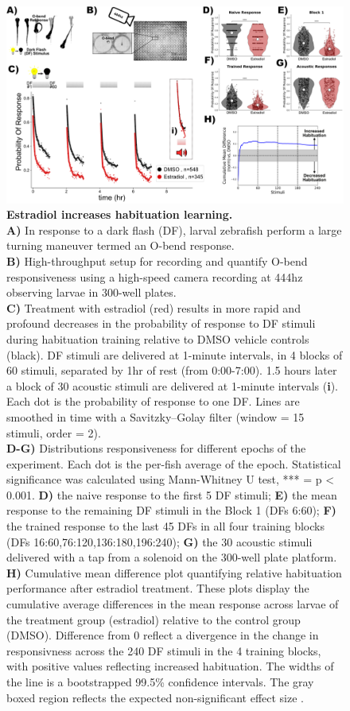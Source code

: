 \documentclass[9pt,lineno]{RandlettLab_elife}
\begin{document}
\begin{figure}
\begin{fullwidth}
\begin{center}
\includegraphics[width=0.75\linewidth]{figures/EstradiolEffect.png}
\caption{\textbf{Estradiol increases habituation learning.}
\\ \textbf{A)} In response to a dark flash (DF), larval zebrafish perform a large turning maneuver termed an O-bend response.
\\ \textbf{B)} High-throughput setup for recording and quantify O-bend responsiveness using a high-speed camera recording at 444hz observing larvae in 300-well plates.
\\ \textbf{C)} Treatment with estradiol (red) results in more rapid and profound decreases in the probability of response to DF stimuli during habituation training relative to DMSO vehicle controls (black). DF stimuli are delivered at 1-minute intervals, in 4 blocks of 60 stimuli, separated by 1hr of rest (from 0:00-7:00). 1.5 hours later a block of 30 acoustic stimuli are delivered at 1-minute intervals (\textbf{i}). Each dot is the probability of response to one DF. Lines are smoothed in time with a Savitzky–Golay filter (window = 15 stimuli, order = 2). 
\\ \textbf{D-G)} Distributions responsiveness for different epochs of the experiment. Each dot is the per-fish average of the epoch. Statistical significance was calculated using Mann-Whitney U test, *** = p < 0.001.  \textbf{D)} the naive response to the first 5 DF stimuli; \textbf{E)} the mean response to the remaining DF stimuli in the Block 1 (DFs 6:60); \textbf{F)} the trained response to the last 45 DFs in all four training blocks (DFs 16:60,76:120,136:180,196:240); \textbf{G)} the 30 acoustic stimuli delivered with a tap from a solenoid on the 300-well plate platform. 
\\ \textbf{H)} Cumulative mean difference plot quantifying relative habituation performance after estradiol treatment. These plots display the cumulative average differences in the mean response across larvae of the treatment group (estradiol) relative to the control group (DMSO). Difference from 0 reflect a divergence in the change in responsivness across the 240 DF stimuli in the 4 training blocks, with positive values reflecting increased habituation. The widths of the line is a bootstrapped 99.5\% confidence intervals. The gray boxed region reflects the expected non-significant effect size \citep{Randlett2019-fj}.
}
\end{center}
\end{fullwidth}
\end{figure}
\end{document}
